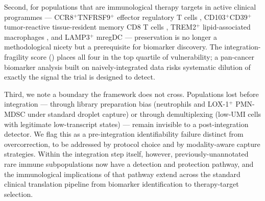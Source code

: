 Second, for populations that are immunological therapy targets in active clinical programmes --- CCR8$^+$TNFRSF9$^+$ effector regulatory T cells \citep{desimone2016ttregsig, vandamme2021depletion}, CD103$^+$CD39$^+$ tumor-reactive tissue-resident memory CD8 T cells \citep{duhen2018coexpression, caushi2021transcriptional}, TREM2$^+$ lipid-associated macrophages \citep{molgora2020trem2}, and LAMP3$^+$ mregDC \citep{maier2020conserved} --- preservation is no longer a methodological nicety but a prerequisite for biomarker discovery. The integration-fragility score () places all four in the top quartile of vulnerability; a pan-cancer biomarker analysis built on naively-integrated data risks systematic dilution of exactly the signal the trial is designed to detect.

Third, we note a boundary the framework does not cross. Populations lost before integration --- through library preparation bias (neutrophils and LOX-1$^+$ PMN-MDSC under standard droplet capture) or through demultiplexing (low-UMI cells with legitimate low-transcript states) --- remain invisible to a post-integration detector. We flag this as a pre-integration identifiability failure distinct from overcorrection, to be addressed by protocol choice and by modality-aware capture strategies. Within the integration step itself, however, previously-unannotated rare immune subpopulations now have a detection and protection pathway, and the immunological implications of that pathway extend across the standard clinical translation pipeline from biomarker identification to therapy-target selection.

